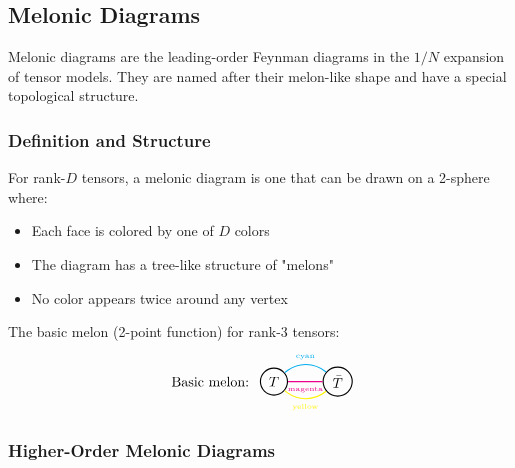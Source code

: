 \subsection{Melonic Diagrams}

Melonic diagrams are the leading-order Feynman diagrams in the $1/N$ expansion of tensor models. They are named after their melon-like shape and have a special topological structure.

\subsubsection{Definition and Structure}

For rank-$D$ tensors, a melonic diagram is one that can be drawn on a 2-sphere where:
\begin{itemize}
\item Each face is colored by one of $D$ colors
\item The diagram has a tree-like structure of "melons"
\item No color appears twice around any vertex
\end{itemize}

The basic melon (2-point function) for rank-3 tensors:
\[
\begin{tikzpicture}[baseline=0, scale=0.8]
   \node at (-2,0) {Basic melon:};
   \node[circle, draw, thick] (L) at (0,0) {$T$};
   \node[circle, draw, thick] (R) at (2,0) {$\bar{T}$};
   \draw[cyan, thick] (L) to[bend left=40] node[above] {\tiny cyan} (R);
   \draw[magenta, thick] (L) to node[below] {\tiny magenta} (R);
   \draw[yellow, thick] (L) to[bend right=40] node[below] {\tiny yellow} (R);
\end{tikzpicture}
\]

\subsubsection{Higher-Order Melonic Diagrams}

